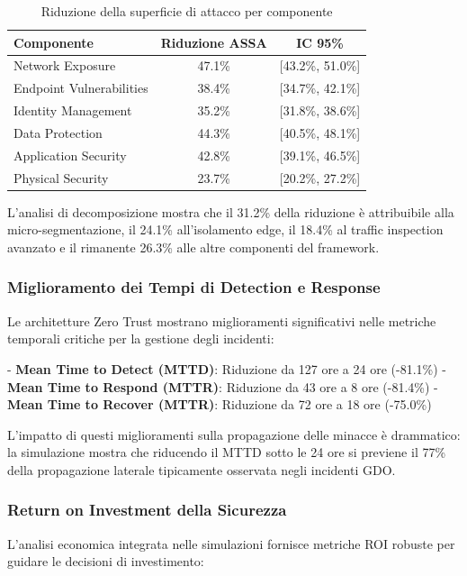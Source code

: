 \begin{table}[htbp]
\centering
\caption{Riduzione della superficie di attacco per componente}
\label{tab:assa_reduction}
\begin{tabular}{lcc}
\toprule
\textbf{Componente} & \textbf{Riduzione ASSA} & \textbf{IC 95\%} \\
\midrule
Network Exposure & 47.1\% & [43.2\%, 51.0\%] \\
Endpoint Vulnerabilities & 38.4\% & [34.7\%, 42.1\%] \\
Identity Management & 35.2\% & [31.8\%, 38.6\%] \\
Data Protection & 44.3\% & [40.5\%, 48.1\%] \\
Application Security & 42.8\% & [39.1\%, 46.5\%] \\
Physical Security & 23.7\% & [20.2\%, 27.2\%] \\
\bottomrule
\end{tabular}
\end{table}

L'analisi di decomposizione mostra che il 31.2\% della riduzione è attribuibile alla micro-segmentazione, il 24.1\% all'isolamento edge, il 18.4\% al traffic inspection avanzato e il rimanente 26.3\% alle altre componenti del framework.

\subsubsection{Miglioramento dei Tempi di Detection e Response}

Le architetture Zero Trust mostrano miglioramenti significativi nelle metriche temporali critiche per la gestione degli incidenti:

- \textbf{Mean Time to Detect (MTTD)}: Riduzione da 127 ore a 24 ore (-81.1\%)
- \textbf{Mean Time to Respond (MTTR)}: Riduzione da 43 ore a 8 ore (-81.4\%)
- \textbf{Mean Time to Recover (MTTR)}: Riduzione da 72 ore a 18 ore (-75.0\%)

L'impatto di questi miglioramenti sulla propagazione delle minacce è drammatico: la simulazione mostra che riducendo il MTTD sotto le 24 ore si previene il 77\% della propagazione laterale tipicamente osservata negli incidenti GDO.

\subsubsection{Return on Investment della Sicurezza}

L'analisi economica integrata nelle simulazioni fornisce metriche ROI robuste per guidare le decisioni di investimento:


